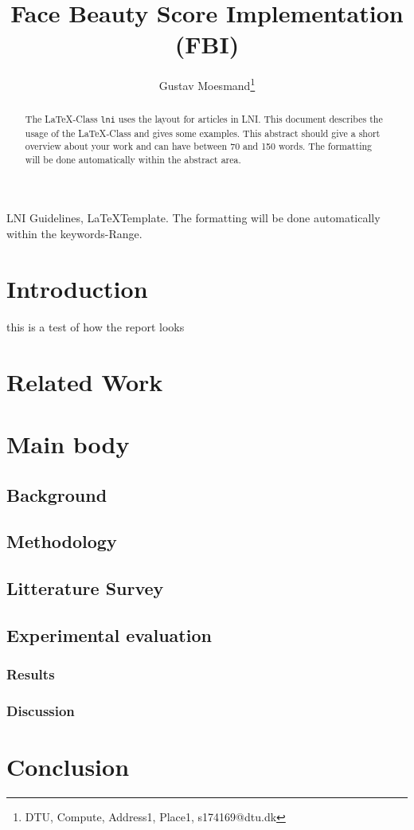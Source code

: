 \documentclass[english]{lni}
\author{Gustav Moesmand\footnote{DTU, Compute, Address1, Place1, s174169@dtu.dk}}
\title{Face Beauty Score Implementation (FBI)}
\renewcommand{\headrulewidth}{0.4pt} %
\begin{document}
\maketitle
\renewcommand{\refname}{References}
\setcounter{footnote}{2} %
\thispagestyle{titlepage}
\pagestyle{fancy}
\fancyhead{} %
\fancyfoot{} %
\renewcommand{\headrulewidth}{0.4pt} %

\begin{abstract}
	The \LaTeX-Class \texttt{lni} uses the layout for articles in LNI. This document describes the usage of the \LaTeX-Class and gives some examples. This abstract should give a short overview about your work and can have between 70 and 150 words. The formatting will be done automatically within the abstract area.
\end{abstract}
\begin{keywords}
	LNI Guidelines, \LaTeX Template. The formatting will be done automatically within the keywords-Range.
\end{keywords}

\section{Introduction}
this is a test of how the report looks

\section{Related Work}

\section{Main body}
\subsection{Background}
\subsection{Methodology}
\subsection{Litterature Survey}
\subsection{Experimental evaluation}
\subsubsection{Results}
\subsubsection{Discussion}

\section{Conclusion}
\end{document}
